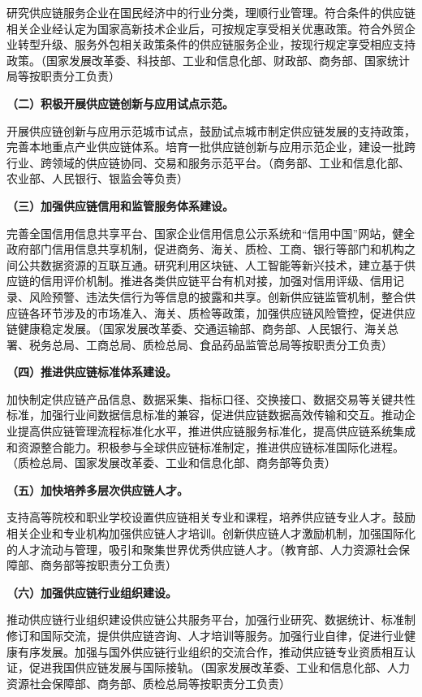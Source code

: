 研究供应链服务企业在国民经济中的行业分类，理顺行业管理。符合条件的供应链相关企业经认定为国家高新技术企业后，可按规定享受相关优惠政策。符合外贸企业转型升级、服务外包相关政策条件的供应链服务企业，按现行规定享受相应支持政策。（国家发展改革委、科技部、工业和信息化部、财政部、商务部、国家统计局等按职责分工负责）

{ \bf （二）积极开展供应链创新与应用试点示范。 }

开展供应链创新与应用示范城市试点，鼓励试点城市制定供应链发展的支持政策，完善本地重点产业供应链体系。培育一批供应链创新与应用示范企业，建设一批跨行业、跨领域的供应链协同、交易和服务示范平台。（商务部、工业和信息化部、农业部、人民银行、银监会等负责）

{ \bf （三）加强供应链信用和监管服务体系建设。 }

完善全国信用信息共享平台、国家企业信用信息公示系统和“信用中国”网站，健全政府部门信用信息共享机制，促进商务、海关、质检、工商、银行等部门和机构之间公共数据资源的互联互通。研究利用区块链、人工智能等新兴技术，建立基于供应链的信用评价机制。推进各类供应链平台有机对接，加强对信用评级、信用记录、风险预警、违法失信行为等信息的披露和共享。创新供应链监管机制，整合供应链各环节涉及的市场准入、海关、质检等政策，加强供应链风险管控，促进供应链健康稳定发展。（国家发展改革委、交通运输部、商务部、人民银行、海关总署、税务总局、工商总局、质检总局、食品药品监管总局等按职责分工负责）

{ \bf （四）推进供应链标准体系建设。 }

加快制定供应链产品信息、数据采集、指标口径、交换接口、数据交易等关键共性标准，加强行业间数据信息标准的兼容，促进供应链数据高效传输和交互。推动企业提高供应链管理流程标准化水平，推进供应链服务标准化，提高供应链系统集成和资源整合能力。积极参与全球供应链标准制定，推进供应链标准国际化进程。（质检总局、国家发展改革委、工业和信息化部、商务部等负责）

{ \bf （五）加快培养多层次供应链人才。 }

支持高等院校和职业学校设置供应链相关专业和课程，培养供应链专业人才。鼓励相关企业和专业机构加强供应链人才培训。创新供应链人才激励机制，加强国际化的人才流动与管理，吸引和聚集世界优秀供应链人才。（教育部、人力资源社会保障部、商务部等按职责分工负责）

{ \bf （六）加强供应链行业组织建设。 }

推动供应链行业组织建设供应链公共服务平台，加强行业研究、数据统计、标准制修订和国际交流，提供供应链咨询、人才培训等服务。加强行业自律，促进行业健康有序发展。加强与国外供应链行业组织的交流合作，推动供应链专业资质相互认证，促进我国供应链发展与国际接轨。（国家发展改革委、工业和信息化部、人力资源社会保障部、商务部、质检总局等按职责分工负责）



